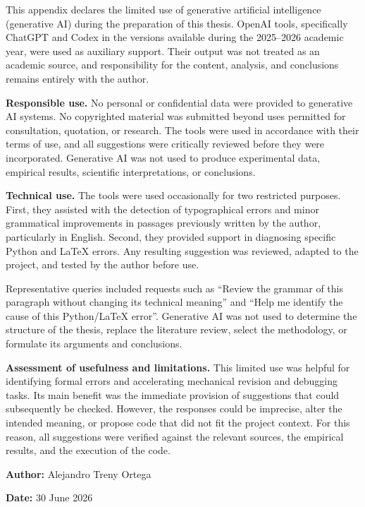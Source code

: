 
\label{app:ai-declaration}

\noindent This appendix declares the limited use of generative artificial intelligence (generative AI) during the preparation of this thesis. OpenAI tools, specifically ChatGPT and Codex in the versions available during the 2025--2026 academic year, were used as auxiliary support. Their output was not treated as an academic source, and responsibility for the content, analysis, and conclusions remains entirely with the author.

\medskip
\noindent\textbf{Responsible use.}
No personal or confidential data were provided to generative AI systems. No copyrighted material was submitted beyond uses permitted for consultation, quotation, or research. The tools were used in accordance with their terms of use, and all suggestions were critically reviewed before they were incorporated. Generative AI was not used to produce experimental data, empirical results, scientific interpretations, or conclusions.

\medskip
\noindent\textbf{Technical use.}
The tools were used occasionally for two restricted purposes. First, they assisted with the detection of typographical errors and minor grammatical improvements in passages previously written by the author, particularly in English. Second, they provided support in diagnosing specific Python and LaTeX errors. Any resulting suggestion was reviewed, adapted to the project, and tested by the author before use.

\noindent Representative queries included requests such as \enquote{Review the grammar of this paragraph without changing its technical meaning} and \enquote{Help me identify the cause of this Python/LaTeX error}. Generative AI was not used to determine the structure of the thesis, replace the literature review, select the methodology, or formulate its arguments and conclusions.

\medskip
\noindent\textbf{Assessment of usefulness and limitations.}
This limited use was helpful for identifying formal errors and accelerating mechanical revision and debugging tasks. Its main benefit was the immediate provision of suggestions that could subsequently be checked. However, the responses could be imprecise, alter the intended meaning, or propose code that did not fit the project context. For this reason, all suggestions were verified against the relevant sources, the empirical results, and the execution of the code.

\medskip
\noindent\textbf{Author:} Alejandro Treny Ortega

\noindent\textbf{Date:} 30 June 2026
